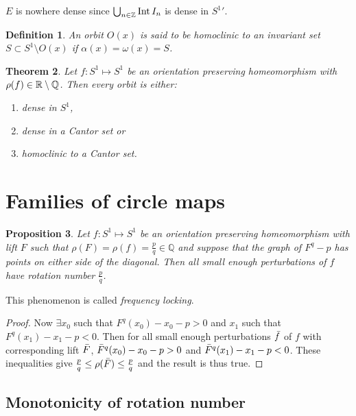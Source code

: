\documentclass{notes}
\newcommand{\Q}{\mathbb{Q}}
\DeclareMathOperator{\inter}{Int}
\theoremstyle{plain}
\newtheorem{proposition}{Proposition}[chapter]
\newtheorem{theorem}[proposition]{Theorem}
\newtheorem{definition}[proposition]{Definition}
\begin{document}
$E$ is nowhere dense since $\bigcup_{n \in \Z} \inter I_n$ is dense
in $S^1{}'$.

\begin{definition}
An orbit $O(x)$ is said to be homoclinic to an invariant set $S \subset
S^1 \setminus O(x)$ if $\alpha(x) = \omega(x) = S$.
\end{definition}

\begin{theorem}
  Let $f \colon S^1 \mapsto S^1$ be an orientation preserving
  homeomorphism with $\rho(f) \in \R \setminus \Q$.  Then every orbit
  is either:

\begin{enumerate}
\item dense in $S^1$,
\item dense in a Cantor set or
\item homoclinic to a Cantor set.
\end{enumerate}
\end{theorem}

\section{Families of circle maps}

\begin{proposition}
  Let $f \colon S^1 \mapsto S^1$ be an orientation preserving
  homeomorphism with lift $F$ such that $\rho(F) = \rho(f) =
  \tfrac{p}{q} \in \Q$ and suppose that the graph of $F^q - p$ has
  points on either side of the diagonal.  Then all small enough
  perturbations of $f$ have rotation number $\tfrac{p}{q}$.
\end{proposition}

This phenomenon is called \emph{frequency locking}.

\begin{proof}
  Now $\exists x_0$ such that $F^q(x_0) - x_0 - p > 0$ and $x_1$ such
  that $F^q(x_1) - x_1 - p < 0$.  Then for all small enough
  perturbations $\Bar{f}$ of $f$ with corresponding lift $\Bar{F}$,
  $\Bar{F}^q(x_0) - x_0 - p > 0$ and $\Bar{F}^q(x_1) - x_1 - p < 0$.
  These inequalities give $\tfrac{p}{q} \le \rho(\Bar{F}) \le
  \tfrac{p}{q}$ and the result is thus true.
\end{proof}

\subsection{Monotonicity of rotation number}
\end{document}
